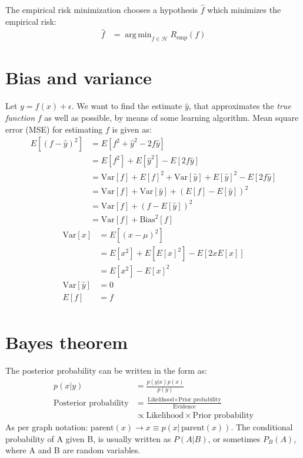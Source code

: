 \documentclass{book}
\DeclareMathOperator*{\argmin}{arg\,min}
\begin{document}
The empirical risk minimization chooses a hypothesis $\hat{f}$ which minimizes the empirical risk:
\begin{align*}
\hat{f} &=  \argmin_{f \in \mathcal{H}}{R_{\mbox{emp}}(f)}
\end{align*}

\section{Bias and variance}
Let $y = f(x) + \epsilon$. We want to find the estimate $\hat{y}$, that approximates the \emph{true function} $f$ as well as possible, by means of some learning algorithm. Mean square error (MSE) for estimating $f$ is given as:
\begin{align*}
E[(f-\hat{y})^2] &= E[f^2 + \hat{y}^2 - 2f\hat{y}]\\
			             &= E[f^2] + E[\hat{y}^2] - E[2f\hat{y}]\\
			             &= \mbox{Var}[f] + E[f]^2 + \mbox{Var}[\hat{y}] + E[\hat{y}]^2 - E[2f\hat{y}] \\
			             &= \mbox{Var}[f] +  \mbox{Var}[\hat{y}] + (E[f] - E[\hat{y}])^2 \\
			             &= \mbox{Var}[f] +  (f - E[\hat{y}])^2 \\
			             &= \mbox{Var}[f] + \mbox{Bias}^2[f]
\end{align*}
\begin{align*}
\mbox{Var}[x] &= E[(x-\mu)^2]\\
			           &= E[x^2] + E[E[x]^2] - E[2xE[x]]\\		 
			           &= E[x^2] - E[x]^2\\		
\mbox{Var}[\hat{y}] &= 0\\
E[f]  &= f\\		 			          	 			                     
\end{align*}

\section{Bayes theorem}
The posterior probability can be written in the form as:
\begin{align*} 
p(x|y) &= \frac{p(y|x)p(x)}{p(y)} \\
\mbox{Posterior probability} &= \frac{\mbox{Likelihood} \times \mbox {Prior probability}}{\mbox{Evidence}} \\
& \propto \mbox{Likelihood} \times \mbox {Prior probability}
\end{align*}
As per graph notation: $\mbox{parent}(x) \rightarrow x  \equiv p(x|\,\mbox{parent}(x))$.
The conditional probability of A given B, is usually written as $P(A|B)$, or sometimes $P_B(A)$, where A and B are random variables.
\end{document}
